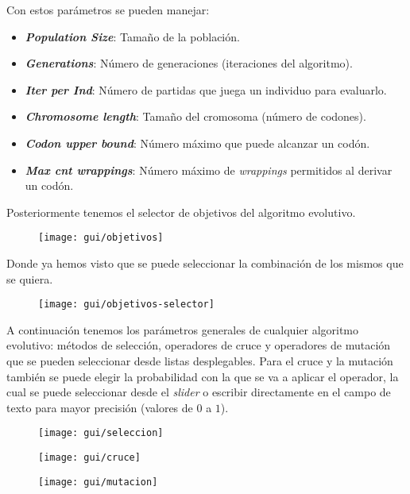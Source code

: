 Con estos parámetros se pueden manejar:
\begin{itemize}
\item \textbf{\textit{Population Size}}: Tamaño de la población.

\item \textbf{\textit{Generations}}: Número de generaciones (iteraciones del algoritmo).

\item \textbf{\textit{Iter per Ind}}: Número de partidas que juega un individuo para evaluarlo.

\item \textbf{\textit{Chromosome length}}: Tamaño del cromosoma (número de codones).

\item \textbf{\textit{Codon upper bound}}: Número máximo que puede alcanzar un codón.

\item \textbf{\textit{Max cnt wrappings}}: Número máximo de \textit{wrappings} permitidos al derivar un codón.
\end{itemize}

Posteriormente tenemos el selector de objetivos del algoritmo evolutivo.
\begin{figure}[H]
\centering
\texttt{[image: gui/objetivos]}
\end{figure}

Donde ya hemos visto que se puede seleccionar la combinación de los mismos que se quiera.
\begin{figure}[H]
\centering
\texttt{[image: gui/objetivos-selector]}
\end{figure}

A continuación tenemos los parámetros generales de cualquier algoritmo evolutivo: métodos de selección, operadores de cruce y operadores de mutación que se pueden seleccionar desde listas desplegables. Para el cruce y la mutación también se puede elegir la probabilidad con la que se va a aplicar el operador, la cual se puede seleccionar desde el \textit{slider} o escribir directamente en el campo de texto para mayor precisión (valores de $0$ a $1$).
\begin{figure}[H]
\centering
\texttt{[image: gui/seleccion]}
\end{figure}
\begin{figure}[H]
\centering
\texttt{[image: gui/cruce]}
\end{figure}
\begin{figure}[H]
\centering
\texttt{[image: gui/mutacion]}
\end{figure}

